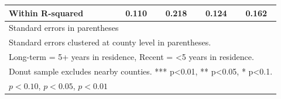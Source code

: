 \begin{table}[htbp]
\begin{tabular}{l*{4}{c}}
Within R-squared&       0.110         &       0.218         &       0.124         &       0.162         \\
\hline\hline
\multicolumn{5}{l}{\footnotesize Standard errors in parentheses}\\
\multicolumn{5}{l}{\footnotesize Standard errors clustered at county level in parentheses.}\\
\multicolumn{5}{l}{\footnotesize Long-term = 5+ years in residence, Recent = <5 years in residence.}\\
\multicolumn{5}{l}{\footnotesize Donut sample excludes nearby counties. *** p<0.01, ** p<0.05, * p<0.1.}\\
\multicolumn{5}{l}{\footnotesize \sym{*} \(p<0.10\), \sym{**} \(p<0.05\), \sym{***} \(p<0.01\)}\\
\end{tabular}
\end{table}
